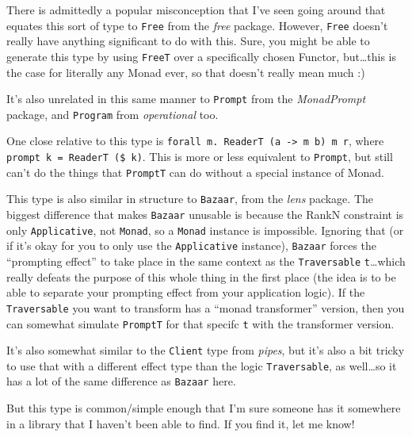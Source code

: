 \documentclass[]{article}
\begin{document}
There is admittedly a popular misconception that I've seen going around that
equates this sort of type to \texttt{Free} from the \emph{free} package.
However, \texttt{Free} doesn't really have anything significant to do with this.
Sure, you might be able to generate this type by using \texttt{FreeT} over a
specifically chosen Functor, but\ldots{}this is the case for literally any Monad
ever, so that doesn't really mean much :)

It's also unrelated in this same manner to \texttt{Prompt} from the
\emph{MonadPrompt} package, and \texttt{Program} from \emph{operational} too.

One close relative to this type is
\texttt{forall\ m.\ ReaderT\ (a\ -\textgreater{}\ m\ b)\ m\ r}, where
\texttt{prompt\ k\ =\ ReaderT\ (\$\ k)}. This is more or less equivalent to
\texttt{Prompt}, but still can't do the things that \texttt{PromptT} can do
without a special instance of Monad.

This type is also similar in structure to \texttt{Bazaar}, from the \emph{lens}
package. The biggest difference that makes \texttt{Bazaar} unusable is because
the RankN constraint is only \texttt{Applicative}, not \texttt{Monad}, so a
\texttt{Monad} instance is impossible. Ignoring that (or if it's okay for you to
only use the \texttt{Applicative} instance), \texttt{Bazaar} forces the
``prompting effect'' to take place in the same context as the
\texttt{Traversable} \texttt{t}\ldots{}which really defeats the purpose of this
whole thing in the first place (the idea is to be able to separate your
prompting effect from your application logic). If the \texttt{Traversable} you
want to transform has a ``monad transformer'' version, then you can somewhat
simulate \texttt{PromptT} for that specifc \texttt{t} with the transformer
version.

It's also somewhat similar to the \texttt{Client} type from \emph{pipes}, but
it's also a bit tricky to use that with a different effect type than the logic
\texttt{Traversable}, as well\ldots{}so it has a lot of the same difference as
\texttt{Bazaar} here.

But this type is common/simple enough that I'm sure someone has it somewhere in
a library that I haven't been able to find. If you find it, let me know!
\end{document}
